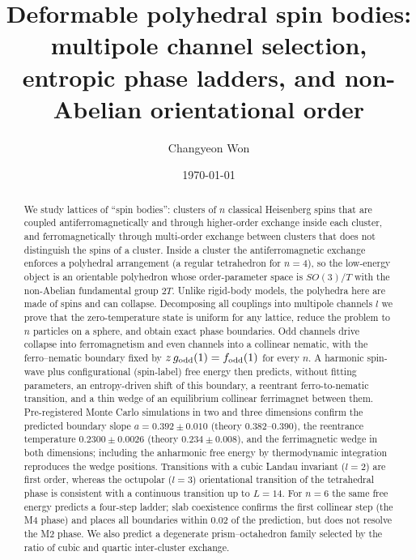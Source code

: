 \documentclass[pre,twocolumn,superscriptaddress,amsmath,amssymb,floatfix]{revtex4-2}
\begin{document}
\title{Deformable polyhedral spin bodies: multipole channel selection, entropic phase ladders, and non-Abelian orientational order}

\author{Changyeon Won}

\date{\today}

\begin{abstract}
We study lattices of ``spin bodies'': clusters of $n$ classical Heisenberg spins that are coupled antiferromagnetically and through higher-order exchange inside each cluster, and ferromagnetically through multi-order exchange between clusters that does not distinguish the spins of a cluster. Inside a cluster the antiferromagnetic exchange enforces a polyhedral arrangement (a regular tetrahedron for $n=4$), so the low-energy object is an orientable polyhedron whose order-parameter space is $SO(3)/T$ with the non-Abelian fundamental group $2T$. Unlike rigid-body models, the polyhedra here are made of spins and can collapse. Decomposing all couplings into multipole channels $l$ we prove that the zero-temperature state is uniform for any lattice, reduce the problem to $n$ particles on a sphere, and obtain exact phase boundaries. Odd channels drive collapse into ferromagnetism and even channels into a collinear nematic, with the ferro--nematic boundary fixed by $z\,g_{\rm odd}(1)=f_{\rm odd}(1)$ for every $n$. A harmonic spin-wave plus configurational (spin-label) free energy then predicts, without fitting parameters, an entropy-driven shift of this boundary, a reentrant ferro-to-nematic transition, and a thin wedge of an equilibrium collinear ferrimagnet between them. Pre-registered Monte Carlo simulations in two and three dimensions confirm the predicted boundary slope $a=0.392\pm0.010$ (theory 0.382--0.390), the reentrance temperature $0.2300\pm0.0026$ (theory $0.234\pm0.008$), and the ferrimagnetic wedge in both dimensions; including the anharmonic free energy by thermodynamic integration reproduces the wedge positions. Transitions with a cubic Landau invariant ($l=2$) are first order, whereas the octupolar ($l=3$) orientational transition of the tetrahedral phase is consistent with a continuous transition up to $L=14$. For $n=6$ the same free energy predicts a four-step ladder; slab coexistence confirms the first collinear step (the M4 phase) and places all boundaries within $0.02$ of the prediction, but does not resolve the M2 phase. We also predict a degenerate prism--octahedron family selected by the ratio of cubic and quartic inter-cluster exchange.
\end{abstract}
\end{document}
